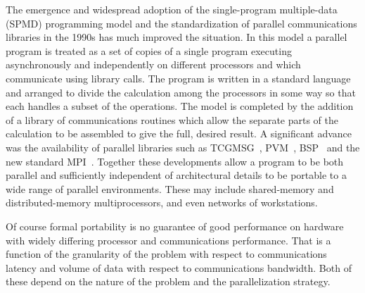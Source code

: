 \documentclass[a4paper,twoside]{report}
\begin{document}
The emergence and widespread adoption of the single-program
multiple-data (SPMD) programming model and the standardization of
parallel communications libraries in the 1990s has much improved the
situation.  In this model a parallel program is treated as a set of
copies of a single program executing asynchronously and independently
on different processors and which communicate using library calls.
The program is written in a standard language and arranged to divide
the calculation among the processors in some way so that each handles
a subset of the operations. The model is completed by the addition of
a library of communications routines which allow the separate parts of
the calculation to be assembled to give the full, desired result. A
significant advance was the availability of parallel libraries such as
TCGMSG~\cite{tcgmsg:94}, PVM~\cite{pvm:94}, BSP~\cite{bsp:93} and the new
standard MPI~\cite{mpi:94}.  Together these developments allow a program
to be both parallel and sufficiently independent of architectural
details to be portable to a wide range of parallel environments.
These may include shared-memory and distributed-memory
multiprocessors, and even networks of workstations.  

Of course formal portability is no guarantee of good performance on
hardware with widely differing processor and communications
performance. That is a function of the granularity of the problem with
respect to communications latency and volume of data with respect to
communications bandwidth. Both of these depend on the nature of the
problem and the parallelization strategy.
\end{document}
